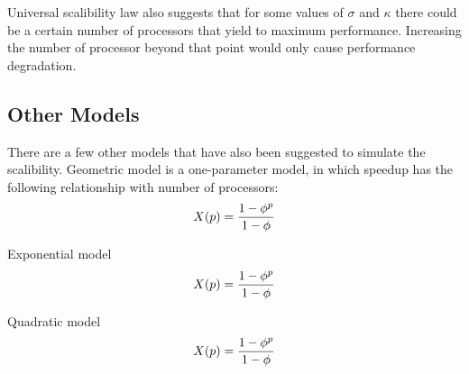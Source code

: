 Universal scalibility law also suggests that for some values of $\sigma$ and $\kappa$ there could be a certain number of processors that yield to maximum performance\cite{gunther2007guerrilla}. Increasing the number of processor beyond that point would only cause performance degradation.  

\vspace{\baselineskip}
\subsection{Other Models}	
There are a few other models that have also been suggested to simulate the scalibility. Geometric model is a one-parameter model, in which speedup has the following relationship with number of processors:
\begin{equation}\label{geo}
X(p) = \frac{1-\phi^{p}}{1-\phi}\\
\end{equation}

Exponential model
\begin{equation}\label{expo}
X(p) = \frac{1-\phi^{p}}{1-\phi}\\
\end{equation}

Quadratic model
\begin{equation}\label{quad}
X(p) = \frac{1-\phi^{p}}{1-\phi}\\
\end{equation}